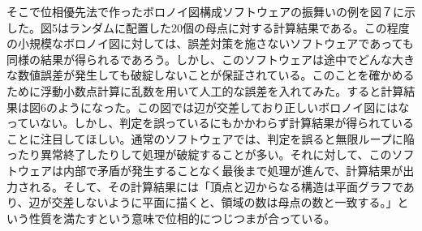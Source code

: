 \documentclass[../main]{jsarticle}
\begin{document}
そこで位相優先法で作ったボロノイ図構成ソフトウェアの振舞いの例を図７に示した。図5はランダムに配置した20個の母点に対する計算結果である。この程度の小規模なボロノイ図に対しては、誤差対策を施さないソフトウェアであっても同様の結果が得られるであろう。しかし、このソフトウェアは途中でどんな大きな数値誤差が発生しても破綻しないことが保証されている。このことを確かめるために浮動小数点計算に乱数を用いて人工的な誤差を入れてみた。すると計算結果は図6のようになった。この図では辺が交差しており正しいボロノイ図にはなっていない。しかし、判定を誤っているにもかかわらず計算結果が得られていることに注目してほしい。通常のソフトウェアでは、判定を誤ると無限ループに陥ったり異常終了したりして処理が破綻することが多い。それに対して、このソフトウェアは内部で矛盾が発生することなく最後まで処理が進んで、計算結果が出力される。そして、その計算結果には「頂点と辺からなる構造は平面グラフであり、辺が交差しないように平面に描くと、領域の数は母点の数と一致する。」という性質を満たすという意味で位相的につじつまが合っている。
\end{document}
